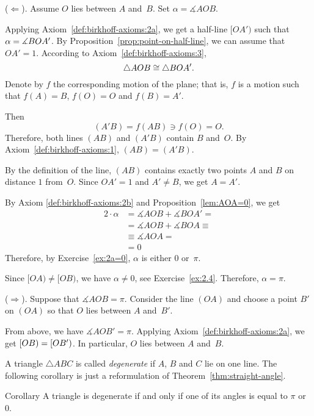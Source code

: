 \parit{}($\Leftarrow$).
Assume $O$  
lies between $A$ and~$B$.
Set  $\alpha=\measuredangle A O B$.

Applying Axiom~\ref{def:birkhoff-axioms:2a},
we get a half-line $[OA')$ such that $\alpha\z=\measuredangle B O A'$.
By Proposition~\ref{prop:point-on-half-line}, we can assume that $OA'=1$.
According to Axiom~\ref{def:birkhoff-axioms:3},
\[\triangle AOB\z\cong\triangle BOA'.\]
Denote by $f$ the corresponding motion of the plane;
that is, $f$ is a motion such that $f(A)=B$, $f(O)=O$ and $f(B)=A'$. 

Then 
\[(A'B)=f(AB)\ni f(O)=O.\]
Therefore, both lines $(AB)$ and $(A'B)$ contain $B$ and~$O$.
By Axiom~\ref{def:birkhoff-axioms:1}, $(AB)=(A'B)$.

By the definition of the line,
$(AB)$ contains exactly two points $A$ and $B$ on distance $1$ from~$O$.
Since $OA'=1$ and $A'\ne B$, we get $A=A'$.

By Axiom \ref{def:birkhoff-axioms:2b} and Proposition~\ref{lem:AOA=0}, we get
\begin{align*}
2\cdot\alpha&=
\measuredangle AOB+\measuredangle BOA'=
\\
&=\measuredangle AOB+\measuredangle BOA\equiv
\\
&\equiv\measuredangle AOA=
\\
&= 0
\end{align*}
Therefore, by Exercise~\ref{ex:2a=0}, $\alpha$ is either $0$ or~$\pi$.

Since $[OA)\ne [OB)$,  
we have $\alpha\ne 0$, see Exercise~\ref{ex:2.4}.
Therefore, $\alpha=\pi$.


\parit{}($\Rightarrow$).
Suppose that $\measuredangle A O B= \pi$.
Consider the line $(OA)$ and choose a point $B'$ on $(OA)$ so that $O$ lies between $A$ and~$B'$.

From above, we have $\measuredangle AOB'=\pi$.
Applying Axiom~\ref{def:birkhoff-axioms:2a}, 
we get $[O B)\z=[O B')$.
In particular, $O$ lies between $A$ and~$B$.
\qeds 

A triangle $\triangle ABC$ is called 
\emph{degenerate}
if $A$, $B$ and $C$ lie on one line.
The following corollary is just a reformulation of Theorem~\ref{thm:straight-angle}.

\begin{thm}[\abs]{Corollary}\label{cor:degenerate=pi}
A triangle is degenerate if and only if one of its angles is equal to $\pi$ or~$0$.
\end{thm}

